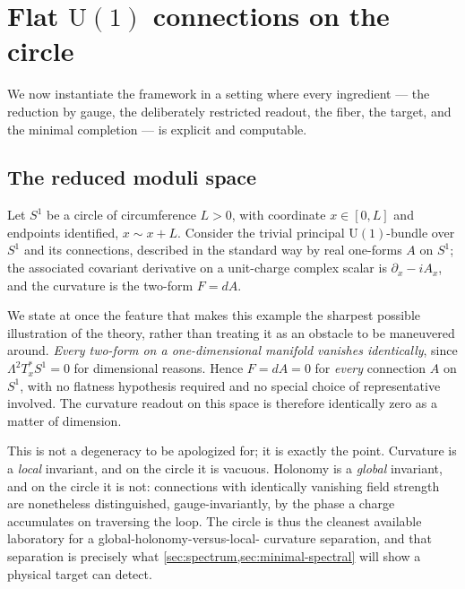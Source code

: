 \documentclass[11pt,reqno]{amsart}
\theoremstyle{plain}
\theoremstyle{definition}
\newcommand{\Uone}{\mathrm{U}(1)}
\begin{document}
\section{Flat \texorpdfstring{$\Uone$}{U(1)} connections on the circle}\label{sec:flat}

We now instantiate the framework in a setting where every ingredient --- the reduction by gauge,
the deliberately restricted readout, the fiber, the target, and the minimal completion --- is
explicit and computable.

\subsection{The reduced moduli space}

Let $S^1$ be a circle of circumference $L>0$, with coordinate $x\in[0,L]$ and endpoints
identified, $x\sim x+L$. Consider the trivial principal $\Uone$-bundle over $S^1$ and its
connections, described in the standard way by real one-forms $A$ on $S^1$; the associated
covariant derivative on a unit-charge complex scalar is $\partial_x-iA_x$, and the curvature is
the two-form $F=dA$.

We state at once the feature that makes this example the sharpest possible illustration of the
theory, rather than treating it as an obstacle to be maneuvered around. \emph{Every two-form on a
one-dimensional manifold vanishes identically}, since $\Lambda^2 T^*_xS^1=0$ for dimensional
reasons. Hence $F=dA=0$ for \emph{every} connection $A$ on $S^1$, with no flatness hypothesis
required and no special choice of representative involved. The curvature readout on this space is
therefore identically zero as a matter of dimension.

This is not a degeneracy to be apologized for; it is exactly the point. Curvature is a
\emph{local} invariant, and on the circle it is vacuous. Holonomy is a \emph{global} invariant,
and on the circle it is not: connections with identically vanishing field strength are
nonetheless distinguished, gauge-invariantly, by the phase a charge accumulates on traversing the
loop. The circle is thus the cleanest available laboratory for a global-holonomy-versus-local-
curvature separation, and that separation is precisely what \cref{sec:spectrum,sec:minimal-spectral}
will show a physical target can detect.
\end{document}
